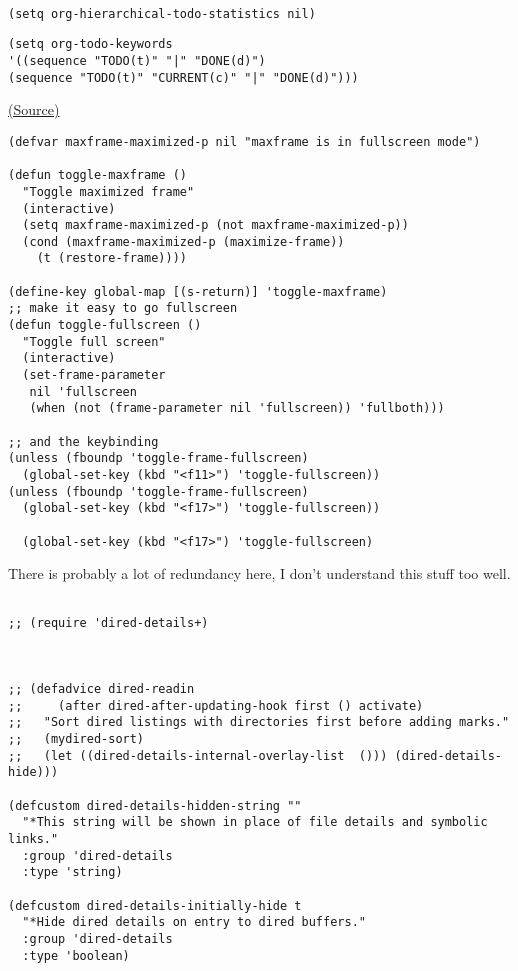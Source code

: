 \documentclass[11pt]{article}
\begin{document}
\begin{verbatim}

(setq org-hierarchical-todo-statistics nil)
\end{verbatim}
\label{sec:org3712dc3}
\begin{verbatim}
(setq org-todo-keywords
'((sequence "TODO(t)" "|" "DONE(d)")
(sequence "TODO(t)" "CURRENT(c)" "|" "DONE(d)")))
\end{verbatim}
\label{sec:org412817b}

\href{http://amitp.blogspot.ca/2008/05/emacs-full-screen-on-mac-os-x.html}{(Source)}

\begin{verbatim}
(defvar maxframe-maximized-p nil "maxframe is in fullscreen mode")

(defun toggle-maxframe ()
  "Toggle maximized frame"
  (interactive)
  (setq maxframe-maximized-p (not maxframe-maximized-p))
  (cond (maxframe-maximized-p (maximize-frame))
	(t (restore-frame))))

(define-key global-map [(s-return)] 'toggle-maxframe)
;; make it easy to go fullscreen
(defun toggle-fullscreen ()
  "Toggle full screen"
  (interactive)
  (set-frame-parameter
   nil 'fullscreen
   (when (not (frame-parameter nil 'fullscreen)) 'fullboth)))

;; and the keybinding
(unless (fboundp 'toggle-frame-fullscreen)
  (global-set-key (kbd "<f11>") 'toggle-fullscreen))
(unless (fboundp 'toggle-frame-fullscreen)
  (global-set-key (kbd "<f17>") 'toggle-fullscreen))

  (global-set-key (kbd "<f17>") 'toggle-fullscreen)

\end{verbatim}
\label{sec:org1e030dd}

There is probably a lot of redundancy here, I don't understand this stuff too
well.

\begin{verbatim}

;; (require 'dired-details+)



;; (defadvice dired-readin
;;     (after dired-after-updating-hook first () activate)
;;   "Sort dired listings with directories first before adding marks."
;;   (mydired-sort)
;;   (let ((dired-details-internal-overlay-list  ())) (dired-details-hide)))

(defcustom dired-details-hidden-string ""
  "*This string will be shown in place of file details and symbolic links."
  :group 'dired-details
  :type 'string)

(defcustom dired-details-initially-hide t
  "*Hide dired details on entry to dired buffers."
  :group 'dired-details
  :type 'boolean)
\end{verbatim}
\end{document}
